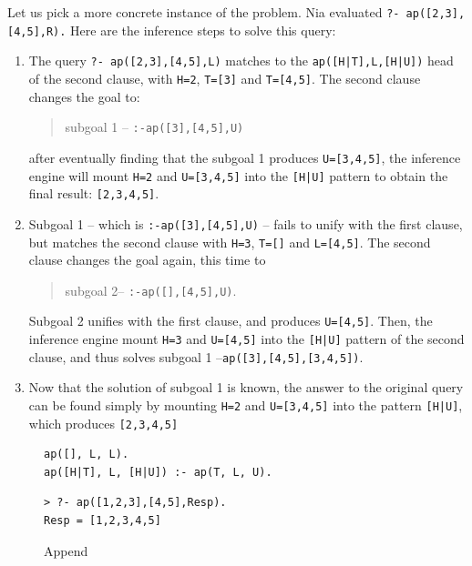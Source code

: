 \documentclass[a4paper,12pt]{book}
\newenvironment{fmpage}[1]
{\begin{lrbox}{\fmbox}\begin{minipage}{#1}}
{\end{minipage}\end{lrbox}\fbox{\usebox{\fmbox}}}
\begin{document}
Let us pick a more concrete instance of the problem.
Nia evaluated \verb|?- ap([2,3], [4,5],R).| Here are the
inference steps to solve this query:
\begin{enumerate}
\item The query \verb/?- ap([2,3],[4,5],L)/ matches
to the \verb/ap([H|T],L,[H|U])/ head of the second clause,
with \verb|H=2|, \verb|T=[3]| and \verb|T=[4,5]|.
The second clause changes the goal to:
\begin{quote}
	subgoal 1 -- \verb/:-ap([3],[4,5],U)/
\end{quote}
after eventually finding that the subgoal 1 produces
\verb|U=[3,4,5]|, the inference engine will mount
\verb/H=2/ and \verb/U=[3,4,5]/ into the \verb/[H|U]/
pattern to obtain the final result: \verb/[2,3,4,5]/.
\item Subgoal 1 -- which is \verb/:-ap([3],[4,5],U)/
      -- fails to unify with the first clause, but
      matches the second clause with \verb|H=3|,
      \verb|T=[]| and \verb|L=[4,5]|. The second clause
      changes the goal again, this time to
\begin{quote}
      subgoal 2-- \verb|:-ap([],[4,5],U)|.
\end{quote}
Subgoal 2 unifies with the first clause,
and produces \verb/U=[4,5]/. Then, the inference
engine mount \verb|H=3| and \verb|U=[4,5]| into
the \verb/[H|U]/ pattern of the second clause,
and thus solves subgoal 1 --\verb/ap([3],[4,5],[3,4,5])/.
\item Now that the solution of subgoal 1 is known,
the answer to the original query can be found simply
by mounting \verb/H=2/ and \verb/U=[3,4,5]/ into
the pattern \verb/[H|U]/, which produces \verb/[2,3,4,5]/
\end{enumerate}

\begin{figure}[!h]
\begin{fmpage}{0.8\linewidth}
\begin{verbatim}
ap([], L, L).
ap([H|T], L, [H|U]) :- ap(T, L, U).
\end{verbatim}
\end{fmpage}

\begin{fmpage}{0.8\linewidth}
\begin{verbatim}
> ?- ap([1,2,3],[4,5],Resp).
Resp = [1,2,3,4,5]
\end{verbatim}
\end{fmpage}
\caption{Append}
\label{rec/ap}
\end{figure}
\end{document}
